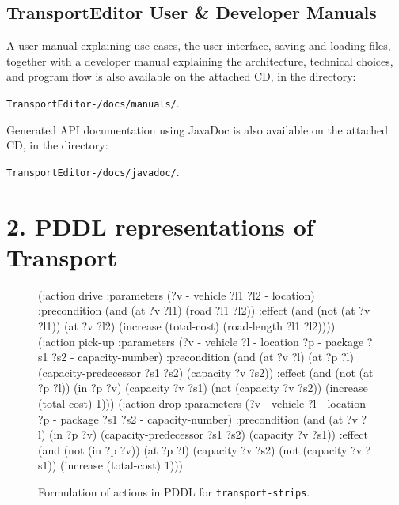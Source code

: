 \subsection*{TransportEditor User \& Developer Manuals}\label{transporteditor-manuals}

A user manual explaining use-cases, the user interface, saving and loading files, together with a developer manual explaining the architecture, technical choices, and program flow
is also available on the attached CD, in the directory:
\begin{center}
\texttt{TransportEditor-\TEver{}/docs/manuals/}.
\end{center}
Generated API documentation using JavaDoc is also available on the attached CD, in the directory:
\begin{center}
\texttt{TransportEditor-\TEver{}/docs/javadoc/}.
\end{center}


\newpage

\section*{2. PDDL representations of Transport}\label{pddl-repr}

\begin{figure}[h]
\begin{code}
(:action drive
  :parameters (?v - vehicle ?l1 ?l2 - location)
  :precondition (and
      (at ?v ?l1)
      (road ?l1 ?l2))
  :effect (and
      (not (at ?v ?l1))
      (at ?v ?l2)
      (increase (total-cost) (road-length ?l1 ?l2))))
(:action pick-up
  :parameters (?v - vehicle ?l - location ?p - package
               ?s1 ?s2 - capacity-number)
  :precondition (and
      (at ?v ?l)
      (at ?p ?l)
      (capacity-predecessor ?s1 ?s2)
      (capacity ?v ?s2))
  :effect (and
      (not (at ?p ?l))
      (in ?p ?v)
      (capacity ?v ?s1)
      (not (capacity ?v ?s2))
      (increase (total-cost) 1)))
(:action drop
  :parameters (?v - vehicle ?l - location ?p - package
               ?s1 ?s2 - capacity-number)
  :precondition (and
      (at ?v ?l)
      (in ?p ?v)
      (capacity-predecessor ?s1 ?s2)
      (capacity ?v ?s1))
  :effect (and
      (not (in ?p ?v))
      (at ?p ?l)
      (capacity ?v ?s2)
      (not (capacity ?v ?s1))
      (increase (total-cost) 1)))
\end{code}
\caption*{Formulation of actions in PDDL for \texttt{transport-strips}.}
\label{code:pddl-strips}
\end{figure}

